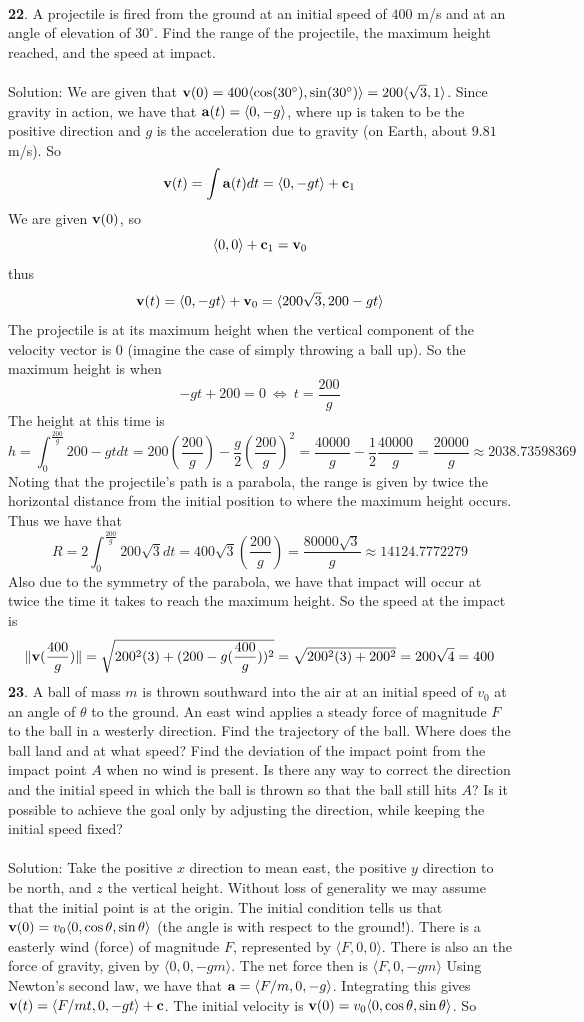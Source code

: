\documentclass[12pt]{amsbook}
\newcommand{\la}{\langle}
\newcommand{\ra}{\rangle}
\begin{document}
\\
{\small\bf 22}. A projectile is fired from the ground at an initial speed of $400$ m/s and at
an angle of elevation of $30^{\circ}$. Find the range of the projectile, the maximum height reached, and the speed at impact.
\\
\\
{\sc Solution}: We are given that ${\bf v}(0)=400\la \cos(30^{\circ}), \sin(30^{\circ}) \ra=200\la \sqrt{3}, 1 \ra$. Since gravity in action, we have that ${\bf a}(t)=\la 0, -g\ra$, where up is taken to be the positive direction and $g$ is the acceleration due to gravity (on Earth, about $9.81$ m/s). So
$${\bf v}(t)=\int {\bf a}(t)dt = \la 0, -gt \ra +{\bf c}_1$$
We are given ${\bf v}(0)$, so 
$$\la 0,0 \ra + {\bf c}_1 = {\bf v}_0$$
thus
$${\bf v}(t)=\la 0, -gt \ra + {\bf v}_0 = \la 200\sqrt{3}, 200-gt \ra$$
The projectile is at its maximum height when the vertical component of the velocity vector is $0$ (imagine the case of simply throwing a ball up). So the maximum height is when
$$-gt+200=0 \ \Leftrightarrow \ t=\frac{200}{g}$$
The height at this time is 
$$h=\int_0^\frac{200}{g}200-gtdt=200(\frac{200}{g})-\frac{g}{2}(\frac{200}{g})^2=\frac{40000}{g}-\frac{1}{2}\frac{40000}{g}=\frac{20000}{g} \approx 2038.73598369$$
Noting that the projectile's path is a parabola, the range is given by twice the horizontal distance from the initial position to where the maximum height occurs. Thus we have that
$$R=2\int_0^{\frac{200}{g}}200\sqrt{3}dt = 400\sqrt{3}(\frac{200}{g})=\frac{80000\sqrt{3}}{g} \approx 14124.7772279$$
Also due to the symmetry of the parabola, we have that impact will occur at twice the time it takes to reach the maximum height. So the speed at the impact
is
$$\|{\bf v}(\frac{400}{g})\|=\sqrt{200^2(3)+(200-g(\frac{400}{g}))^2}=\sqrt{200^2(3)+200^2}=200\sqrt{4}=400$$
{\small\bf 23}. A ball of mass $m$ is thrown southward into the air at an initial speed
of $v_0$ at an angle of $\theta$ to the ground. An east wind applies a steady force of
magnitude $F$ to the ball in a westerly direction. Find the trajectory of the
ball. Where does the ball land and at what speed? Find the deviation of
the impact point from the impact point $A$ when no wind is present. Is there
any way to correct the direction and the initial speed in which the ball is
thrown so that the ball still hits $A$? Is it possible to achieve the goal only
by adjusting the direction, while keeping the initial speed fixed?
\\
\\
{\sc Solution}: Take the positive $x$ direction to mean east, the positive $y$ direction to be north, and $z$ the vertical height. Without loss of generality we may assume that the initial point is at the origin. The initial condition tells us that ${\bf v}(0)=v_0\la 0, \cos \theta, \sin \theta \ra$ (the angle is with respect to the ground!). There is a easterly wind (force) of magnitude $F$, represented by $\la F,0,0 \ra$. There is also an the force of gravity, given by $\la 0,0,-gm \ra$. The net force then is $\la F,0,-gm \ra$ Using Newton's second law, we have that ${\bf a}=\la F/m,0,-g \ra$. Integrating this gives ${\bf v}(t)=\la F/m t,0,-gt  \ra +{\bf c}$. The initial velocity is ${\bf v}(0)=v_0\la 0,\cos \theta, \sin \theta \ra$. So
\end{document}
